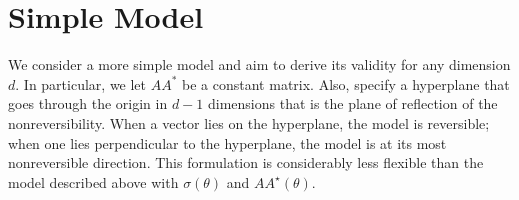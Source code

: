 \documentclass[11pt]{article}
\newcommand{\vint}{\boldsymbol{\omega}}
\newcommand{\vpla}{\boldsymbol{a}}
\begin{document}
%
%


\section{Simple Model}

We consider a more simple model and aim to derive its validity for any dimension $d$. In particular, we let $AA^*$ be a constant matrix. Also, specify a hyperplane that goes through the origin in $d-1$ dimensions that is the plane of reflection of the nonreversibility. When a vector lies on the hyperplane, the model is reversible; when one lies perpendicular to the hyperplane, the model is at its most nonreversible direction. This formulation is considerably less flexible than the model described above with $\sigma(\theta)$ and $AA^\star(\theta)$.
\end{document}
